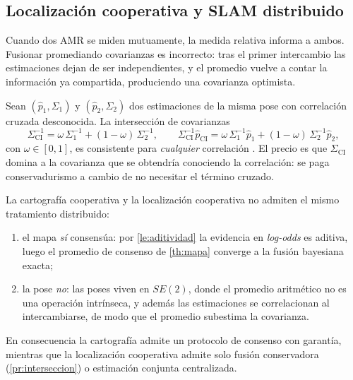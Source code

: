 \subsection{Localización cooperativa y SLAM distribuido}

Cuando dos AMR se miden mutuamente, la medida relativa informa a ambos. Fusionar
promediando covarianzas es incorrecto: tras el primer intercambio las
estimaciones dejan de ser independientes, y el promedio vuelve a contar la
información ya compartida, produciendo una covarianza optimista.

\begin{proposicion}
\label{pr:interseccion}
Sean $(\hat p_1,\Sigma_1)$ y $(\hat p_2,\Sigma_2)$ dos estimaciones de la misma
pose con correlación cruzada desconocida. La intersección de covarianzas
\[
  \Sigma_{\mathrm{CI}}^{-1}=\omega\,\Sigma_1^{-1}+(1-\omega)\,\Sigma_2^{-1},
  \qquad
  \Sigma_{\mathrm{CI}}^{-1}\hat p_{\mathrm{CI}}
  =\omega\,\Sigma_1^{-1}\hat p_1+(1-\omega)\,\Sigma_2^{-1}\hat p_2,
\]
con $\omega\in[0,1]$, es consistente para \emph{cualquier} correlación
\cite{julier1997ci}. El precio es que $\Sigma_{\mathrm{CI}}$ domina a la
covarianza que se obtendría conociendo la correlación: se paga conservadurismo a
cambio de no necesitar el término cruzado.
\end{proposicion}

\begin{teorema}
\label{th:asimetria}
La cartografía cooperativa y la localización cooperativa no admiten el mismo
tratamiento distribuido:
\begin{enumerate}[label=(\roman*),leftmargin=2.2em,topsep=0.2em,itemsep=0.15em]
  \item el mapa \emph{sí} consensúa: por \cref{le:aditividad} la evidencia en
  \emph{log-odds} es aditiva, luego el promedio de consenso de \cref{th:mapa}
  converge a la fusión bayesiana exacta;
  \item la pose \emph{no}: las poses viven en $SE(2)$, donde el promedio
  aritmético no es una operación intrínseca, y además las estimaciones se
  correlacionan al intercambiarse, de modo que el promedio subestima la
  covarianza.
\end{enumerate}
En consecuencia la cartografía admite un protocolo de consenso con garantía,
mientras que la localización cooperativa admite solo fusión conservadora
(\cref{pr:interseccion}) o estimación conjunta centralizada.
\end{teorema}

